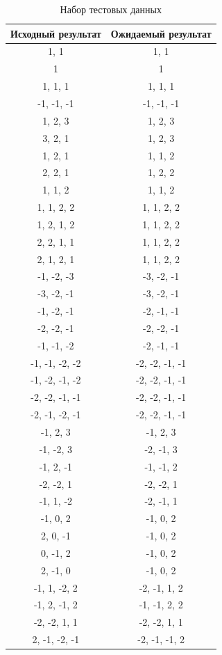 \documentclass[a4paper,14pt]{report}
\begin{document}
\begin{table}[h]
	\caption{Набор тестовых данных}
		\begin{tabular}{|c | c |}
	 	\hline
		Исходный результат & Ожидаемый результат \\ [0.5ex]
	 	\hline\hline
		1, 1 & 1, 1 \\
		\hline
		1 & 1 \\
		\hline
		1, 1, 1 & 1, 1, 1 \\
		\hline
		-1, -1, -1 & -1, -1, -1 \\
		\hline
		1, 2, 3 & 1, 2, 3 \\
		\hline
		3, 2, 1 & 1, 2, 3 \\
		\hline
		1, 2, 1 & 1, 1, 2 \\
		\hline
		2, 2, 1 & 1, 2, 2 \\
		\hline
		1, 1, 2 & 1, 1, 2 \\
		\hline
		1, 1, 2, 2 & 1, 1, 2, 2 \\
		\hline
		1, 2, 1, 2 & 1, 1, 2, 2 \\
		\hline
		2, 2, 1, 1 & 1, 1, 2, 2 \\
		\hline
		2, 1, 2, 1 & 1, 1, 2, 2 \\
		\hline
		-1, -2, -3 & -3, -2, -1 \\
		\hline
		-3, -2, -1 & -3, -2, -1 \\
		\hline
		-1, -2, -1 & -2, -1, -1 \\
		\hline
		-2, -2, -1 & -2, -2, -1 \\
		\hline
		-1, -1, -2 & -2, -1, -1 \\
		\hline
		-1, -1, -2, -2 & -2, -2, -1, -1 \\
		\hline
		-1, -2, -1, -2 & -2, -2, -1, -1 \\
		\hline
		-2, -2, -1, -1 & -2, -2, -1, -1 \\
		\hline
		-2, -1, -2, -1 & -2, -2, -1, -1 \\
		\hline
		-1, 2, 3 & -1, 2, 3 \\
		\hline
		-1, -2, 3 & -2, -1, 3 \\
		\hline
	  -1, 2, -1 & -1, -1, 2 \\
		\hline
	  -2, -2, 1 & -2, -2, 1 \\
		\hline
	  -1, 1, -2 & -2, -1, 1 \\
		\hline
	  -1, 0, 2 & -1, 0, 2 \\
		\hline
	  2, 0, -1 & -1, 0, 2 \\
		\hline
	  0, -1, 2 & -1, 0, 2 \\
		\hline
	  2, -1, 0 & -1, 0, 2 \\
		\hline
	  -1, 1, -2, 2 & -2, -1, 1, 2 \\
		\hline
	  -1, 2, -1, 2 & -1, -1, 2, 2 \\
		\hline
	  -2, -2, 1, 1 & -2, -2, 1, 1 \\
		\hline
	  2, -1, -2, -1 & -2, -1, -1, 2 \\
		\hline

		\end{tabular}
\end{table}
\end{document}
